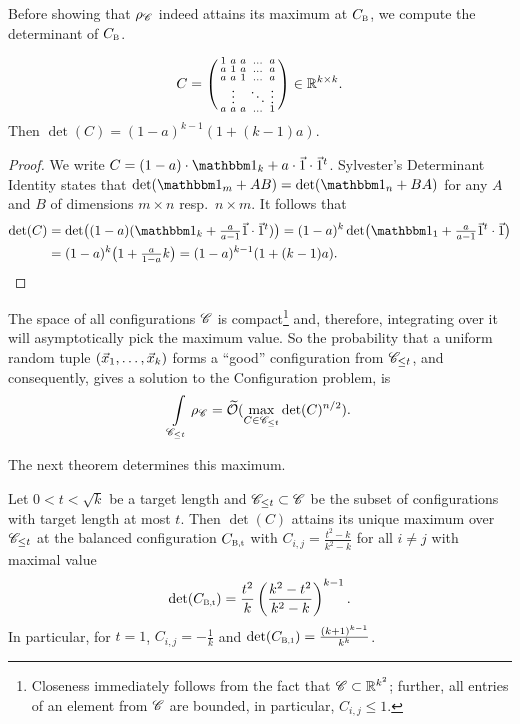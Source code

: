 Before showing that $\rho_{\mathscr{C}}$ indeed attains its maximum at $\Cbal$, we compute the determinant of $\Cbal$.
\begin{lemma} \label{lem:CBalancedDet}
\begin{align*}
C = \begin{psmallmatrix}
         1 & a & a &\ldots & a\\
         a & 1 & a &\ldots & a\\
         a & a & 1 &\ldots & a\\
         & \vdots& &\ddots & \vdots\\
         a & a & a &\ldots & 1
         \end{psmallmatrix}\in{{\mathbb R}}^{k\times k}.
\end{align*}
Then $\det(C) = (1-a)^{k-1}(1+(k-1)a)$.
\end{lemma}
\begin{proof}
	We write $C = (1-a) \cdot \Id_k + a \cdot \onevec \cdot \onevec^t$. Sylvester's Determinant Identity states that $\det(\Id_m + AB) = \det(\Id_n + BA)$ for any $A$ and $B$ of dimensions $m \times n$ resp.\ $n \times m$. It follows that
	\begin{align*}
	\det(C) &=  \det \bigl( (1-a) (\Id_k + \tfrac{a}{a-1} \onevec \cdot \onevec^t) \bigr) = (1-a)^k \det \bigl( \Id_1 + \tfrac{a}{a-1} \onevec^t \cdot \onevec \bigr) \\
	&=(1-a)^k \bigl( 1 + \tfrac{a}{1-a}k \bigr) = (1-a)^{k-1} (1+(k-1)a).
	\end{align*}  
\end{proof}

The space of all configurations $\mathscr{C}$ is compact\footnote{Closeness immediately follows from the fact that $\mathscr{C} \subset {{\mathbb R}}^{k^2}$; further, all entries of an element from $\mathscr{C}$ are bounded, in particular, $C_{i,j}\leq 1$.} and, therefore, integrating over it will asymptotically pick the maximum value. So the probability that a uniform random tuple $(\vec x_1, \ldots, \vec x_k)$ forms a  ``good'' configuration from $\mathscr{C}_{\leq t}$, and consequently, gives a solution to the Configuration problem, is
\[
 \int\limits_{\mathscr{C}_{\leq t}} \rho_{\mathscr{C}} = \widetilde{\mathcal{O}}(\max\limits_{C \in \mathscr{C}_{\leq t}} \det(C)^{n/2}).
\]

The next theorem determines this maximum.

\begin{thm} \label{thm:maxConfig}
	Let $0 < t < \sqrt{k}$ be a target length and $\mathscr{C}_{\leq t} \subset \mathscr{C}$ be the subset of configurations with target length at most $t$. Then $\det(C)$ attains its unique maximum over $\mathscr{C}_{\leq t}$ at the balanced configuration $\Cbalt$ with $C_{i,j} = \frac{t^2-k}{k^2-k}$ for all $i \neq j$ with maximal value
	\[
		\det(\Cbalt) = \frac{t^2}{k} \left( \frac{k^2-t^2}{k^2-k} \right)^{k-1}.
	\] 
	In particular, for $t=1$, $C_{i,j} = -\frac{1}{k}$ and $\det(\CbalOne) = \frac{(k+1)^{k-1}}{k^k}$.
\end{thm}

